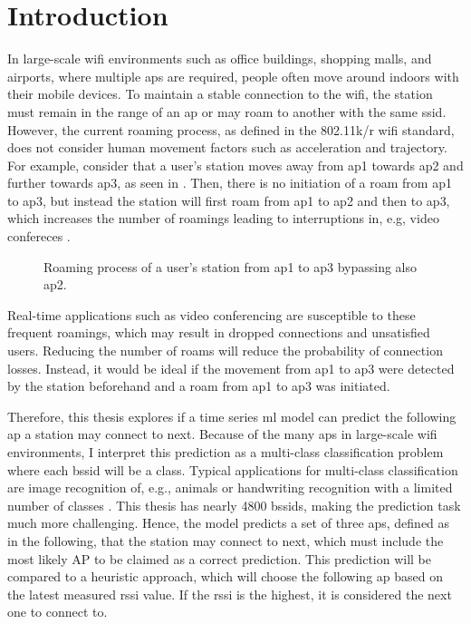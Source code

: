 \chapter{Introduction}\label{ch:intro}

In large-scale \ac{wifi} environments such as office buildings, shopping malls, and airports, where multiple \acp{ap} are required, people often move around indoors with their mobile devices.
To maintain a stable connection to the \ac{wifi}, the station must remain in the range of an \ac{ap} or may roam to another with the same \ac{ssid}.
However, the current roaming process, as defined in the 802.11k/r\cite{802.11k}\cite{802.11r} \ac{wifi} standard, does not consider human movement factors such as acceleration and trajectory.
For example, consider that a user's station moves away from \ac{ap}1 towards \ac{ap}2 and further towards \ac{ap}3, as seen in .
Then, there is no initiation of a roam from \ac{ap}1 to \ac{ap}3, but instead the station will first roam from \ac{ap}1 to \ac{ap}2 and then to \ac{ap}3, which increases the number of roamings leading to interruptions in, e.g, video confereces \cite{handoff_performance_issues}.

\begin{figure}[h]
    \centering
    
    \caption{Roaming process of a user's station from \ac{ap}1 to \ac{ap}3 bypassing also \ac{ap}2.}
    \label{fig:roaming}
\end{figure}

Real-time applications such as video conferencing are susceptible to these frequent roamings, which may result in dropped connections and unsatisfied users.
Reducing the number of roams will reduce the probability of connection losses.
Instead, it would be ideal if the movement from \ac{ap}1 to \ac{ap}3 were detected by the station beforehand and a roam from \ac{ap}1 to \ac{ap}3 was initiated.

Therefore, this thesis explores if a time series \ac{ml} model can predict the following \ac{ap} a station may connect to next.
Because of the many \acp{ap} in large-scale \ac{wifi} environments, I interpret this prediction as a multi-class classification problem where each \ac{bssid} will be a class.
Typical applications for multi-class classification are image recognition of, e.g., animals or handwriting recognition with a limited number of classes \cite{multi-class-classification}.
This thesis has nearly 4800 \acp{bssid}, making the prediction task much more challenging.
Hence, the model predicts a set of three \acp{ap}, defined as \threeAP in the following, that the station may connect to next, which must include the most likely AP to be claimed as a correct prediction.
This prediction will be compared to a heuristic approach, which will choose the following \ac{ap} based on the latest measured \ac{rssi} value.
If the \ac{rssi} is the highest, it is considered the next one to connect to.


